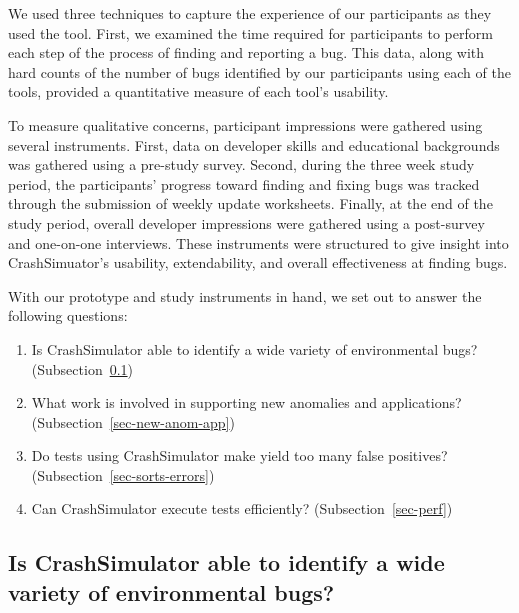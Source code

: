 We used three techniques to capture the experience of our participants as
they used the tool.  First, we examined the time required for participants
to perform each step of the process of finding and reporting a bug.
This data, along with hard counts of the number of bugs identified by our
participants using each of the tools, provided a quantitative measure of
each tool's usability.

To measure qualitative concerns,
participant impressions were gathered using
several instruments.  First, data on developer skills and educational
backgrounds was gathered using a pre-study survey.
Second, during the three week
study period, the participants' progress toward finding and fixing bugs was
tracked through the submission of weekly update worksheets.  Finally, at
the end of the study period, overall developer impressions were gathered
using a post-survey and one-on-one interviews.  These instruments were
structured to give insight into CrashSimuator's usability, extendability, and
overall effectiveness at finding bugs.

With our prototype and study instruments in hand, we
set out to answer the following questions:

\begin{enumerate}

\item{Is CrashSimulator able to identify a wide variety of environmental
    bugs?
(Subsection~\ref{sec-env-bugs})}

\item{What work is involved in supporting new anomalies and applications?
    (Subsection~\ref{sec-new-anom-app})}

\item{Do tests using CrashSimulator make yield too many false positives?
      (Subsection~\ref{sec-sorts-errors})}

\item{Can CrashSimulator
      execute tests efficiently? (Subsection~\ref{sec-perf})}

\end{enumerate}

\subsection{Is CrashSimulator able to identify a wide variety of
environmental bugs?}
\label{sec-env-bugs}

